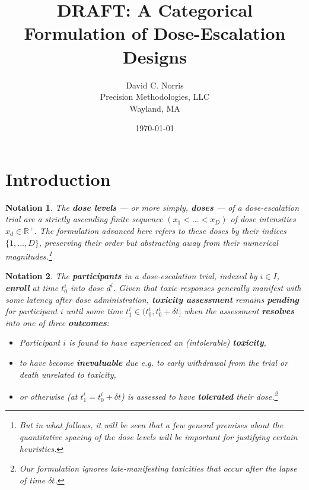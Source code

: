 \documentclass{article}
\newcommand{\R}{\mathbb{R}}
\begin{document}
\newtheorem{thm}{Theorem}[section]
\newtheorem{nota}[thm]{Notation}
\newtheorem{defn}[thm]{Definition}
\newtheorem{fact}[thm]{Fact}
\newtheorem{prop}[thm]{Proposition}
\newtheorem{lemma}[thm]{Lemma}
\newtheorem{corr}[thm]{Corrolary}
\newtheorem{conj}[thm]{Conjecture}
\newtheorem{eg}[thm]{Example}

\newenvironment{sketch}[1][Sketch of proof]{\begin{proof}[#1]\renewcommand*{\qedsymbol}{\(\textcolor{gray}{\blacksquare}\)}}{\end{proof}}

\title{DRAFT: A Categorical Formulation of Dose-Escalation Designs}
\author{David C. Norris\\Precision Methodologies, LLC\\Wayland, MA}
\date{\today{}}

\maketitle

\section{Introduction}

\begin{nota}
  The \textbf{dose levels} --- or more simply, \textbf{doses} --- of a dose-escalation trial are a strictly ascending finite sequence $(x_1 < ... < x_D)$ of dose intensities $x_d \in \R^+$.  The formulation advanced here refers to these doses by their indices $\{1,...,D\}$, preserving their order but abstracting away from their numerical magnitudes.\footnote{But in what follows, it will be seen that a few general premises about the quantitative spacing of the dose levels will be important for justifying certain heuristics.}
\end{nota}

\begin{nota}
  The \textbf{participants} in a dose-escalation trial, indexed by $i \in I$, \textbf{enroll} at time $t_0^i$ into dose $d^i$.  Given that toxic responses generally manifest with some latency after dose administration, \textbf{toxicity assessment} remains \textbf{pending} for participant $i$ until some time $t_1^i \in (t_0^i, t_0^i + \delta t]$ when the assessment \textbf{resolves} into one of three \textbf{outcomes}:
  
  \begin{itemize}
    \item Participant $i$ is found to have experienced an (intolerable) \textbf{toxicity},
    \item to have become \textbf{inevaluable} due e.g. to early withdrawal from the trial or death unrelated to toxicity,
  \item or otherwise (at $t_1^i = t_0^i + \delta t$) is assessed to have \textbf{tolerated} their dose.\footnote{Our formulation ignores late-manifesting toxicities that occur after the lapse of time $\delta t$.}
  \end{itemize}
\end{nota}
\end{document}
